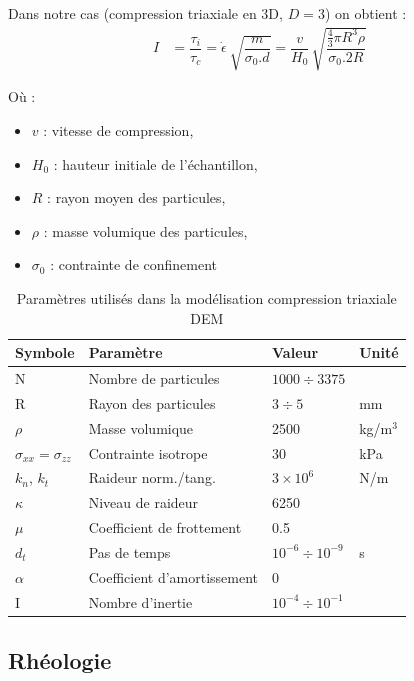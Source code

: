 \documentclass[5p,authoryear,square]{elsarticle}
\begin{document}
    Dans notre cas (compression triaxiale en 3D, $D=3$) on obtient :
    \begin{align}
        I &= \dfrac{\tau_i}{\tau_c}
        = \dot{\epsilon}\ \sqrt{\dfrac{m}{\sigma_0.d}}
        = \dfrac{v}{H_0}\,\sqrt{\dfrac{\tfrac{4}{3}\pi R^3 \rho}{\sigma_{0}.2R}}
    \end{align}

    Où :
    \begin{itemize}
        \item $v$ : vitesse de compression,
        \item $H_0$ : hauteur initiale de l'échantillon,
        \item $R$ : rayon moyen des particules,
        \item $\rho$ : masse volumique des particules,
        \item $\sigma_{0}$ : contrainte de confinement
    \end{itemize}

\begin{table}[htbp]
\centering
\footnotesize
\begin{tabular}{@{}llll@{}}
\toprule
\textbf{Symbole} & \textbf{Paramètre} & \textbf{Valeur} & \textbf{Unité} \\
\midrule
N & Nombre de particules & $1000 \div 3375$ &  \\
R & Rayon des particules & $3 \div 5 $& mm \\
$\rho$ & Masse volumique & 2500 & kg/m$^3$ \\
$\sigma_{xx} = \sigma_{zz}$ & Contrainte isotrope & 30 & kPa \\
$k_n$, $k_t$ & Raideur norm./tang. & $3 \times 10^6$ & N/m \\
$\kappa$ & Niveau de raideur & 6250 &  \\
$\mu$ & Coefficient de frottement & 0.5 &  \\
$d_t$ & Pas de temps & $10^{-6} \div 10^{-9}$ & s \\
$\alpha$ & Coefficient d'amortissement & 0 &  \\
I & Nombre d'inertie & $10^{-4} \div 10^{-1}$ &  \\
\bottomrule
\end{tabular}
\caption{Paramètres utilisés dans la modélisation compression triaxiale DEM}
\label{parametres_triaxiale}
\end{table}



\subsection{Rhéologie}\label{rheologie}
\end{document}
